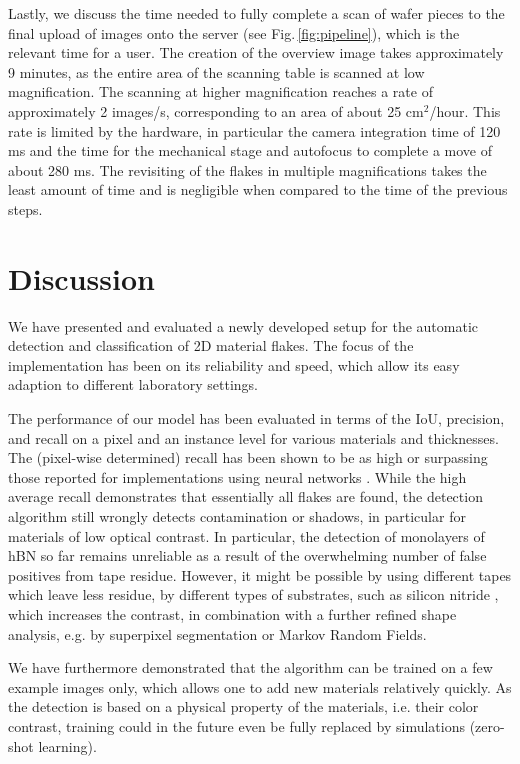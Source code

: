 \documentclass[reprint, prl, superscriptaddress, floatfix]{revtex4-2}
\newcommand{\fig}[1]{Fig.\,\ref{#1}}
\begin{document}
Lastly, we discuss the time needed to fully complete a scan of wafer pieces to the final upload of images onto the server (see \fig{fig:pipeline}), which is the relevant time for a user.
The creation of the overview image takes approximately 9 minutes, as the entire area of the scanning table is scanned at low magnification. 
The scanning at higher magnification reaches a rate of approximately 2 images/s, corresponding to an area of about 25 cm$^2$/hour. %
This rate is limited by the hardware, in particular the camera integration time of 120 ms and the time for the mechanical stage and autofocus to complete a move of about 280 ms.
The revisiting of the flakes in multiple magnifications takes the least amount of time and is negligible when compared to the time of the previous steps.


\section{Discussion}

We have presented and evaluated a newly developed setup for the automatic detection and classification of 2D material flakes.
The focus of the implementation has been on its reliability and speed, which allow its easy adaption to different laboratory settings.
 
The performance of our model has been evaluated in terms of the IoU, precision, and recall on a pixel and an instance level for various materials and thicknesses. 
The (pixel-wise determined) recall has been shown to be as high or surpassing those reported for implementations using neural networks \cite{Han2020Jul, Yang2022Aug, Siao2021}. 
While the high average recall demonstrates that essentially all flakes are found, the detection algorithm still wrongly detects contamination or shadows, in particular for materials of low optical contrast. 
In particular, the detection of monolayers of hBN so far remains unreliable as a result of the overwhelming number of false positives from tape residue.  
However, it might be possible by using different tapes which leave less residue, by different types of substrates, such as silicon nitride \cite{Hattori2022}, which increases the contrast, in combination with a further refined shape analysis, e.g. by superpixel segmentation or Markov Random Fields. 

We have furthermore demonstrated that the algorithm can be trained on a few example images only, which allows one to add new materials relatively quickly.  
As the detection is based on a physical property of the materials, i.e. their color contrast, training could in the future even be fully replaced by simulations (zero-shot learning). 
\end{document}
